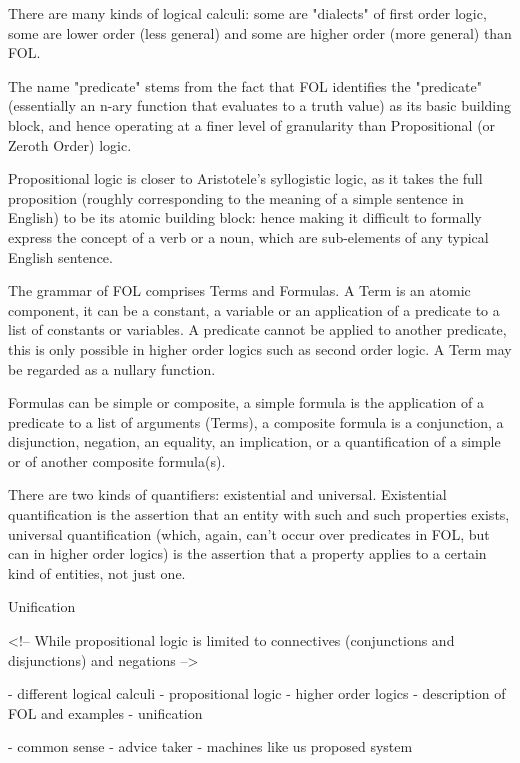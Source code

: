 There are many kinds of logical calculi: some are "dialects" of first order logic, some are lower order (less general) and some are higher order (more general) than FOL.

The name "predicate" stems from the fact that FOL identifies the "predicate" (essentially an n-ary function that evaluates to a truth value) as its basic building block, and hence operating at a finer level of granularity than Propositional (or Zeroth Order) logic.

Propositional logic is closer to Aristotele's syllogistic logic, as it takes the full proposition (roughly corresponding to the meaning of a simple sentence in English) to be its atomic building block: hence making it difficult to formally express the concept of a verb or a noun, which are sub-elements of any typical English sentence.

The grammar of FOL comprises Terms and Formulas. A Term is an atomic component, it can be a constant, a variable or an application of a predicate to a list of constants or variables. A predicate cannot be applied to another predicate, this is only possible in higher order logics such as second order logic. A Term may be regarded as a nullary function.

Formulas can be simple or composite, a simple formula is the application of a predicate to a list of arguments (Terms), a composite formula is a conjunction, a disjunction, negation, an equality, an implication, or a quantification of a simple or of another composite formula(s).

There are two kinds of quantifiers: existential and universal. Existential quantification is the assertion that an entity with such and such properties exists, universal quantification (which, again, can't occur over predicates in FOL, but can in higher order logics) is the assertion that a property applies to a certain kind of entities, not just one.

Unification

\cite{folstan}
\cite{baader2001unification}

<!-- 
While propositional logic is limited to connectives (conjunctions and disjunctions) and negations -->





- different logical calculi
- propositional logic
- higher order logics
- description of FOL and examples
- unification


- common sense
- advice taker
- machines like us proposed system


